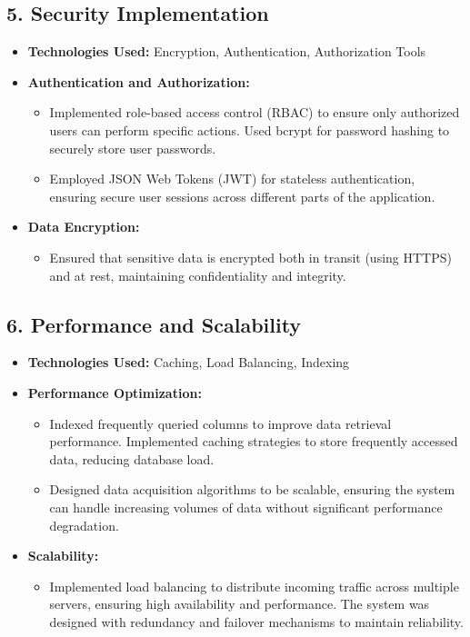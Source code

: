 \subsection{5. Security Implementation}
\begin{itemize}
    \item \textbf{Technologies Used:} Encryption, Authentication, Authorization Tools
    \item \textbf{Authentication and Authorization:}
        \begin{itemize}
            \item Implemented role-based access control (RBAC) to ensure only authorized users can perform specific actions. Used bcrypt for password hashing to securely store user passwords.
            \item Employed JSON Web Tokens (JWT) for stateless authentication, ensuring secure user sessions across different parts of the application.
        \end{itemize}
    \item \textbf{Data Encryption:}
        \begin{itemize}
            \item Ensured that sensitive data is encrypted both in transit (using HTTPS) and at rest, maintaining confidentiality and integrity.
        \end{itemize}
\end{itemize}

\subsection{6. Performance and Scalability}
\begin{itemize}
    \item \textbf{Technologies Used:} Caching, Load Balancing, Indexing
    \item \textbf{Performance Optimization:}
        \begin{itemize}
            \item Indexed frequently queried columns to improve data retrieval performance. Implemented caching strategies to store frequently accessed data, reducing database load.
            \item Designed data acquisition algorithms to be scalable, ensuring the system can handle increasing volumes of data without significant performance degradation.
        \end{itemize}
    \item \textbf{Scalability:}
        \begin{itemize}
            \item Implemented load balancing to distribute incoming traffic across multiple servers, ensuring high availability and performance. The system was designed with redundancy and failover mechanisms to maintain reliability.
        \end{itemize}
\end{itemize}

